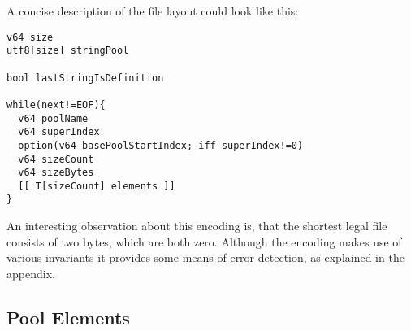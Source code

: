 \documentclass[a4paper,10pt]{article}
\begin{document}
A concise description of the file layout could look like this:
\begin{verbatim}
v64 size
utf8[size] stringPool

bool lastStringIsDefinition

while(next!=EOF){
  v64 poolName
  v64 superIndex
  option(v64 basePoolStartIndex; iff superIndex!=0)
  v64 sizeCount
  v64 sizeBytes
  [[ T[sizeCount] elements ]]
}
\end{verbatim}

An interesting observation about this encoding is, that the shortest legal file consists of two bytes, which are both zero. Although the encoding makes use of various invariants it provides some means of error detection, as explained in the appendix.

\subsection{Pool Elements}
\end{document}
